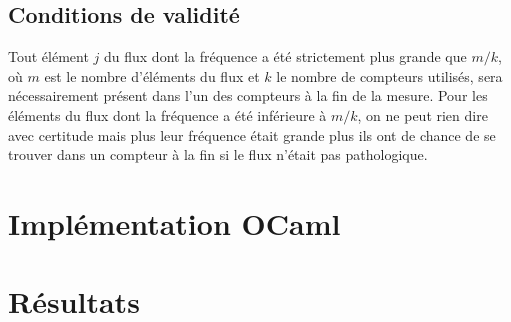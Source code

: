 \documentclass{article}
\begin{document}
	\subsection{Conditions de validité}
		Tout élément $j$ du flux dont la fréquence a été strictement plus grande que $m/k$, où $m$ est le nombre d'éléments 			du 	flux et $k$ le nombre de compteurs utilisés, sera nécessairement présent dans l'un des compteurs à la fin de la 			mesure. Pour les éléments du flux dont la fréquence a été inférieure à $m/k$, on ne peut rien dire avec certitude 				mais plus leur fréquence était grande plus ils ont de chance de se trouver dans un compteur à la fin si le flux 				n'était pas pathologique.
	
\section{Implémentation OCaml}

\section{Résultats}
\end{document}
